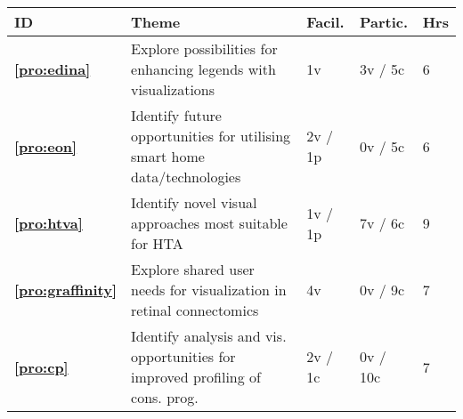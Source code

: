 \begin{table}
    \small
    \centering
    \begin{tabular}{|lp{4cm}lll|}
        \hline
        \textbf{ID} & \textbf{Theme} & \textbf{Facil.} & \textbf{Partic.} & \textbf{Hrs} \\ \hline
        {\bf \ref{pro:edina}} & Explore possibilities for enhancing legends with visualizations & 1v & 3v / 5c & 6 \\
        \hline
        {\bf \ref{pro:eon}} & Identify future opportunities for utilising smart home data/technologies & 2v / 1p & 0v / 5c & 6 \\
        \hline
        {\bf \ref{pro:htva}} & Identify novel visual approaches most suitable for HTA & 1v / 1p & 7v / 6c  & 9  \\
        \hline
        {\bf \ref{pro:graffinity}} & Explore shared user needs for visualization in retinal connectomics & 4v & 0v / 9c & 7 \\
        \hline
        {\bf \ref{pro:cp}} & Identify analysis and vis. opportunities for improved profiling of cons. prog. & 2v / 1c & 0v / 10c & 7 \\

\end{tabular}
\end{table}
